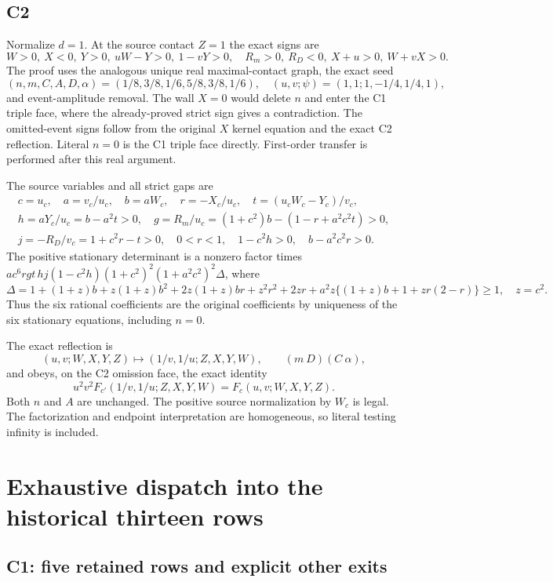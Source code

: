 \documentclass[11pt]{article}
\begin{document}
\subsection{C2}

Normalize $d=1$. At the source contact $Z=1$ the exact signs are
\[
W>0,\ X<0,\ Y>0,\ uW-Y>0,\ 1-vY>0,
\quad R_m>0,\ R_D<0,\ X+u>0,\ W+vX>0.
\]
The proof uses the analogous unique real maximal-contact graph, the
exact seed
\[
(n,m,C,A,D,\alpha)=(1/8,3/8,1/6,5/8,3/8,1/6),
\quad(u,v;\psi)=(1,1;1,-1/4,1/4,1),
\]
and event-amplitude removal. The wall $X=0$ would delete $n$ and enter
the C1 triple face, where the already-proved strict sign gives a
contradiction. The omitted-event signs follow from the original $X$
kernel equation and the exact C2 reflection. Literal $n=0$ is the C1
triple face directly. First-order transfer is performed after this real
argument.

The source variables and all strict gaps are
\begin{gather*}
c=u_c,\quad a=v_c/u_c,\quad b=aW_c,\quad r=-X_c/u_c,
\quad t=(u_cW_c-Y_c)/v_c,\\
h=aY_c/u_c=b-a^2t>0,\quad
g=R_m/u_c=(1+c^2)b-(1-r+a^2c^2t)>0,\\
j=-R_D/v_c=1+c^2r-t>0,\quad0<r<1,\quad
1-c^2h>0,\quad b-a^2c^2r>0.
\end{gather*}
The positive stationary determinant is a nonzero factor times
$ac^6rgt\,hj(1-c^2h)(1+c^2)^2(1+a^2c^2)^2\Delta$,
where
\[
\Delta=1+(1+z)b+z(1+z)b^2+2z(1+z)br+z^2r^2+2zr
 +a^2z\{(1+z)b+1+zr(2-r)\}\ge1,\quad z=c^2.
\]
Thus the six rational coefficients are the original coefficients by
uniqueness of the six stationary equations, including $n=0$.

The exact reflection is
\[
(u,v;W,X,Y,Z)\mapsto(1/v,1/u;Z,X,Y,W),\qquad
(m\ D)(C\ \alpha),
\]
and obeys, on the C2 omission face, the exact identity
\[
u^2v^2F_{c'}(1/v,1/u;Z,X,Y,W)=F_c(u,v;W,X,Y,Z).
\]
Both $n$ and $A$ are unchanged. The positive
source normalization by $W_c$ is legal. The factorization and endpoint
interpretation are homogeneous, so literal testing infinity is included.

\section{Exhaustive dispatch into the historical thirteen rows}

\subsection{C1: five retained rows and explicit other exits}
\end{document}
